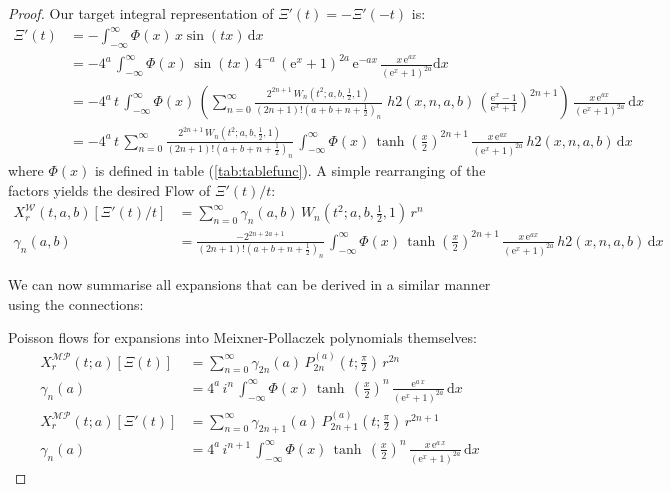 \documentclass[a4paper,11pt,twoside]{amsart}
\newcommand{\verifiedeq}{=}
\newcommand{\verifiedeq}{\stackrel{\checkmark}{=}}
\begin{document}
\begin{proof}
Our target integral representation of $\Xi'(t) = -\Xi'(-t)$ is:
\begin{align}
 \Xi'(t) &\verifiedeq -\int_{-\infty}^\infty \Phi(x)\,x\sin(tx)\, \mathrm{d}x \\
 &\verifiedeq -4^a\,\int_{-\infty}^\infty \Phi(x)\,\sin(tx)\,4^{-a}\,(\mathrm{e}^x+1)^{2a}\,\mathrm{e}^{-ax} \,\frac{x\,\mathrm{e}^{ax}}{(\mathrm{e}^x+1)^{2a}} \mathrm{d}x \\
 &\verifiedeq -4^a\,t\,\int_{-\infty}^\infty \Phi(x)\,\left(\sum_{n=0}^\infty \frac{2^{2n+1}\,W_n\left(t^2;a,b,\frac12,1\right)}{(2n+1)!\left(a+b+n+\frac12\right)_n}\, \,h2(x,n,a,b)\,\left(\frac{\textrm{e}^{x}-1}{\textrm{e}^{x}+1}\right)^{2n+1}\right)\,\frac{x\,\mathrm{e}^{ax}}{(\mathrm{e}^x+1)^{2a}}\, \mathrm{d}x \\
 &\verifiedeq -4^a\,t\,\sum_{n=0}^\infty \frac{2^{2n+1}\,W_n\left(t^2;a,b,\frac12,1\right)}{(2n+1)!\left(a+b+n+\frac12\right)_n}\,\int_{-\infty}^{\infty} \Phi(x)\,\tanh\left(\frac{x}{2}\right)^{2n+1}\,\frac{x\,\mathrm{e}^{ax}}{(\mathrm{e}^x+1)^{2a}}\,h2(x,n,a,b)\,\mathrm{d}x
\end{align}
where $\Phi(x)$ is defined in table (\ref{tab:tablefunc}). A simple rearranging of the factors yields the desired Flow of $\Xi'(t)/t$:
\begin{align}
X^\mathcal{W}_r(t,a,b)\left[\Xi'(t)/t\right] &\verifiedeq \sum_{n=0}^\infty \gamma_n(a,b)\,W_n\left(t^2;a,b,\frac12,1\right)\,r^n \\
  \gamma_n(a,b) &\verifiedeq \frac{-2^{2n+2a+1}}{(2n+1)!\left(a+b+n+\frac12\right)_n}\,\int_{-\infty}^{\infty} \Phi(x)\,\tanh\left(\frac{x}{2}\right)^{2n+1}\,\frac{x\,\mathrm{e}^{ax}}{(\mathrm{e}^x+1)^{2a}}\,h2(x,n,a,b)\,\mathrm{d}x
\end{align}

We can now summarise all expansions that can be derived in a similar manner using the connections:

Poisson flows for expansions into Meixner-Pollaczek polynomials themselves:
\begin{align}
X^\mathcal{MP}_r(t;a)\left[\Xi(t)\right] &\verifiedeq \sum_{n=0}^\infty \gamma_{2n}(a)\,P_{2n}^{(a)}\left(t;\frac{\pi}{2}\right)\,r^{2n} \\
\gamma_n(a) &\verifiedeq 4^a\,i^n\,\int_{-\infty}^{\infty} \Phi(x)\,\tanh\,\left(\frac{x}{2}\right)^n\,\frac{\textrm{e}^{a\,x}}{(\textrm{e}^x+1)^{2a}}\,\mathrm{d}x \\
X^\mathcal{MP}_r(t;a)\left[\Xi'(t)\right] &\verifiedeq \sum_{n=0}^\infty \gamma_{2n+1}(a)\,P_{2n+1}^{(a)}\left(t;\frac{\pi}{2}\right)\,r^{2n+1} \\
\gamma_n(a) &\verifiedeq 4^a\,i^{n+1}\,\int_{-\infty}^{\infty} \Phi(x)\,\tanh\,\left(\frac{x}{2}\right)^n\,\frac{x\,\textrm{e}^{a\,x}}{(\textrm{e}^x+1)^{2a}}\,\mathrm{d}x
\end{align}


\end{proof}
\end{document}
